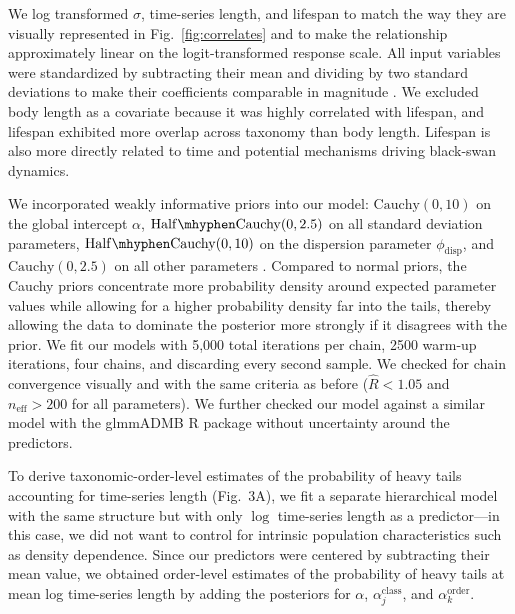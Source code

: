 We log transformed \(\sigma\), time-series length, and lifespan to match the
way they are visually represented in Fig.~\ref{fig:correlates} and to make the
relationship approximately linear on the logit-transformed response scale. All
input variables were standardized by subtracting their mean and dividing by two
standard deviations to make their coefficients comparable in
magnitude \citep{gelman2008c}. We excluded body length as a covariate because it
was highly correlated with lifespan, and lifespan exhibited more overlap across
taxonomy than body length. Lifespan is also more directly related to time and
potential mechanisms driving black-swan dynamics.

We incorporated weakly informative priors into our model: \(\mathrm{Cauchy}(0,
10)\) on the global intercept \(\alpha\), \(\mathrm{Half\mhyphen Cauchy}(0,
2.5)\) on all standard deviation parameters, \(\mathrm{Half\mhyphen Cauchy}(0,
10)\) on the dispersion parameter \(\phi_\mathrm{disp}\), and
\(\mathrm{Cauchy}(0, 2.5)\) on all other parameters \citep{gelman2006c,
gelman2008d}. Compared to normal priors, the Cauchy priors concentrate more
probability density around expected parameter values while allowing for a
higher probability density far into the tails, thereby allowing the data to
dominate the posterior more strongly if it disagrees with the prior. We fit our
models with 5,000 total iterations per chain, 2500 warm-up iterations, four
chains, and discarding every second sample. We checked for chain convergence
visually and with the same criteria as before (\(\widehat{R} < 1.05\) and
\(n_\mathrm{eff} >200\) for all parameters). We further checked our model
against a similar model with the glmmADMB \textsf{R} package \citep{glmmadmb}
without uncertainty around the predictors.

To derive taxonomic-order-level estimates of the probability of heavy tails
accounting for time-series length (Fig.~3A), we fit a separate hierarchical
model with the same structure but with only \(\log\) time-series length as a
predictor---in this case, we did not want to control for intrinsic population
characteristics such as density dependence. Since our predictors were centered
by subtracting their mean value, we obtained order-level estimates of the
probability of heavy tails at mean log time-series length by adding the
posteriors for \(\alpha\), \(\alpha^\mathrm{class}_j\), and
\(\alpha^\mathrm{order}_k\).

